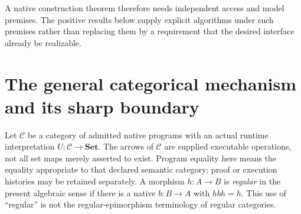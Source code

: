 \documentclass[11pt]{article}
\theoremstyle{definition}
\theoremstyle{remark}
\begin{document}
A native construction theorem therefore needs independent access and model premises. The positive results below supply explicit algorithms under such premises rather than replacing them by a requirement that the desired interface already be realizable.

\section{The general categorical mechanism and its sharp boundary}
Let $\mathcal C$ be a category of admitted native programs with an actual runtime interpretation $U:\mathcal C\to\mathbf{Set}$. The arrows of $\mathcal C$ are supplied executable operations, not all set maps merely asserted to exist. Program equality here means the equality appropriate to that declared semantic category; proof or execution histories may be retained separately. A morphism $h:A\to B$ is \emph{regular} in the present algebraic sense if there is a native $b:B\to A$ with $hbh=h$. This use of ``regular'' is not the regular-epimorphism terminology of regular categories.
\end{document}
